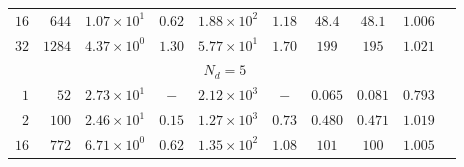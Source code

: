 \begin{table}[htbp]
\begin{tabular}{rr ccc cc cc c}
$16$ & $644$ & $1.07\times 10^{1}$ & $0.62$ & $1.88\times 10^{2}$ & $1.18$ & $48.4$ & $48.1$ & $1.006$ \\
$32$ & $1284$ & $4.37\times 10^{0}$ & $1.30$ & $5.77\times 10^{1}$ & $1.70$ & $199$ & $195$ & $1.021$ \\
\midrule
\multicolumn{9}{c}{\textbf{$N_d = 5$}} \\
\midrule
$1$ & $52$ & $2.73\times 10^{1}$ & $-$ & $2.12\times 10^{3}$ & $-$ & $0.065$ & $0.081$ & $0.793$ \\
$2$ & $100$ & $2.46\times 10^{1}$ & $0.15$ & $1.27\times 10^{3}$ & $0.73$ & $0.480$ & $0.471$ & $1.019$ \\
$16$ & $772$ & $6.71\times 10^{0}$ & $0.62$ & $1.35\times 10^{2}$ & $1.08$ & $101$ & $100$ & $1.005$ \\
\bottomrule
\end{tabular}
\end{table}